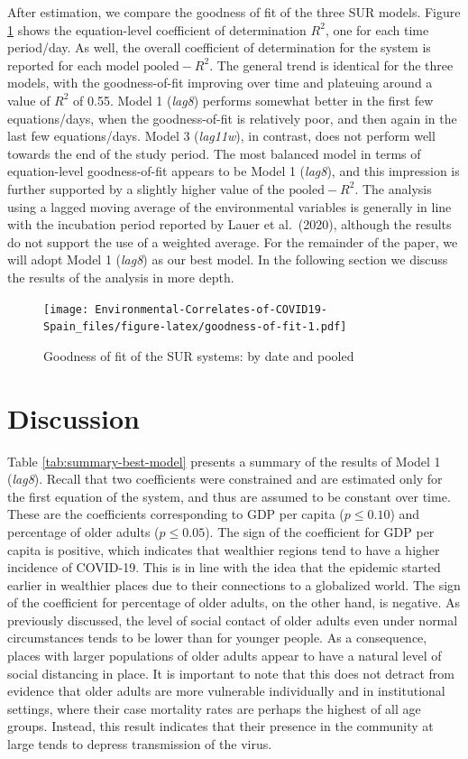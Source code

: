 \documentclass[]{elsarticle} %
\begin{document}
After estimation, we compare the goodness of fit of the three SUR
models. Figure \ref{fig:goodness-of-fit} shows the equation-level
coefficient of determination \(R^2\), one for each time period/day. As
well, the overall coefficient of determination for the system is
reported for each model \(\text{pooled}-R^2\). The general trend is
identical for the three models, with the goodness-of-fit improving over
time and plateuing around a value of \(R^2\) of 0.55. Model 1
(\emph{lag8}) performs somewhat better in the first few equations/days,
when the goodness-of-fit is relatively poor, and then again in the last
few equations/days. Model 3 (\emph{lag11w}), in contrast, does not
perform well towards the end of the study period. The most balanced
model in terms of equation-level goodness-of-fit appears to be Model 1
(\emph{lag8}), and this impression is further supported by a slightly
higher value of the \(\text{pooled}-R^2\). The analysis using a lagged
moving average of the environmental variables is generally in line with
the incubation period reported by Lauer et al.~(2020), although the
results do not support the use of a weighted average. For the remainder
of the paper, we will adopt Model 1 (\emph{lag8}) as our best model. In
the following section we discuss the results of the analysis in more
depth.

\begin{figure}
\centering
\texttt{[image: Environmental-Correlates-of-COVID19-Spain\_files/figure-latex/goodness-of-fit-1.pdf]}
\caption{\label{fig:goodness-of-fit} Goodness of fit of the SUR systems:
by date and pooled}
\end{figure}

\hypertarget{discussion}{%
\section{Discussion}\label{discussion}}

Table \ref{tab:summary-best-model} presents a summary of the results of
Model 1 (\emph{lag8}). Recall that two coefficients were constrained and
are estimated only for the first equation of the system, and thus are
assumed to be constant over time. These are the coefficients
corresponding to GDP per capita (\(p\leq0.10\)) and percentage of older
adults (\(p\leq0.05\)). The sign of the coefficient for GDP per capita
is positive, which indicates that wealthier regions tend to have a
higher incidence of COVID-19. This is in line with the idea that the
epidemic started earlier in wealthier places due to their connections to
a globalized world. The sign of the coefficient for percentage of older
adults, on the other hand, is negative. As previously discussed, the
level of social contact of older adults even under normal circumstances
tends to be lower than for younger people. As a consequence, places with
larger populations of older adults appear to have a natural level of
social distancing in place. It is important to note that this does not
detract from evidence that older adults are more vulnerable individually
and in institutional settings, where their case mortality rates are
perhaps the highest of all age groups. Instead, this result indicates
that their presence in the community at large tends to depress
transmission of the virus.
\end{document}
